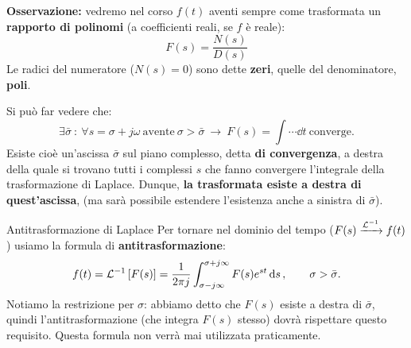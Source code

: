 \textbf{Osservazione:} vedremo nel corso $f(t)$ aventi sempre come trasformata un \textbf{rapporto di polinomi} (a coefficienti reali, se $f$ è reale):
\begin{equation*}
	F(s) = \frac{N(s)}{D(s)}
\end{equation*} 
Le radici del numeratore ($N(s) = 0$) sono dette \textbf{zeri}, quelle del denominatore, \textbf{poli}.

\begin{prop}
Si può far vedere che:
\begin{equation}
	\exists \bar \sigma \ : \ \forall s = \sigma + j \omega \ \textrm{avente} \ \sigma > \bar \sigma \ \longrightarrow \ F(s) = \int \cdots \dd{t} \ \textrm{converge}.
\end{equation}
Esiste cioè un'ascissa $\bar \sigma$ sul piano complesso, detta \textbf{di convergenza}, a destra della quale si trovano tutti i complessi $s$ che fanno convergere l'integrale della trasformazione di Laplace. Dunque, \textbf{la trasformata esiste a destra di quest'ascissa}, (ma sarà possibile estendere l'esistenza anche a sinistra di $\bar \sigma$).
\end{prop}

\begin{defin}{Antitrasformazione di Laplace}{}
Per tornare nel dominio del tempo ($F(s) \xrightarrow{\mathcal{L}^{-1}} f(t)$) usiamo la formula di \textbf{antitrasformazione}:
\begin{equation}
	f(t) = \mathcal{L}^{-1}\left[ F(s) \right] = \frac{1}{2\pi j}\int_{\sigma-j\infty}^{\sigma + j\infty} F(s) e^{st} \dd{s}, \quad \quad \sigma > \bar \sigma.
\end{equation}
Notiamo la restrizione per $\sigma$: abbiamo detto che $F(s)$ esiste a destra di $\bar \sigma$, quindi l'antitrasformazione (che integra $F(s)$ stesso) dovrà rispettare questo requisito. Questa formula non verrà mai utilizzata praticamente.
\end{defin}

